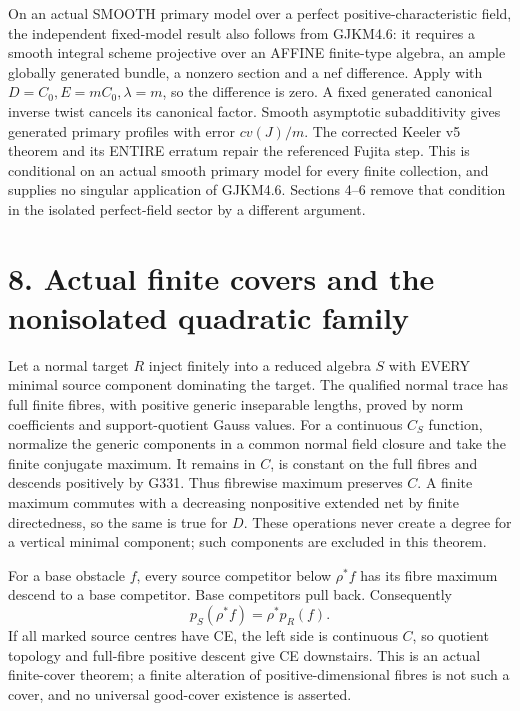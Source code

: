 \documentclass[11pt]{article}
\begin{document}
On an actual SMOOTH primary model over a perfect positive-characteristic field, the independent fixed-model result also follows from GJKM4.6: it requires a smooth integral scheme projective over an AFFINE finite-type algebra, an ample globally generated bundle, a nonzero section and a nef difference. Apply with \(D=C_0,E=mC_0,\lambda=m\), so the difference is zero. A fixed generated canonical inverse twist cancels its canonical factor. Smooth asymptotic subadditivity gives generated primary profiles with error \(c v(J)/m\). The corrected Keeler v5 theorem and its ENTIRE erratum repair the referenced Fujita step. This is conditional on an actual smooth primary model for every finite collection, and supplies no singular application of GJKM4.6. Sections 4--6 remove that condition in the isolated perfect-field sector by a different argument.

\section{8. Actual finite covers and the nonisolated quadratic family}

Let a normal target \(R\) inject finitely into a reduced algebra \(S\) with EVERY minimal source component dominating the target. The qualified normal trace has full finite fibres, with positive generic inseparable lengths, proved by norm coefficients and support-quotient Gauss values. For a continuous \(C_S\) function, normalize the generic components in a common normal field closure and take the finite conjugate maximum. It remains in \(C\), is constant on the full fibres and descends positively by G331. Thus fibrewise maximum preserves \(C\). A finite maximum commutes with a decreasing nonpositive extended net by finite directedness, so the same is true for \(D\). These operations never create a degree for a vertical minimal component; such components are excluded in this theorem.

For a base obstacle \(f\), every source competitor below \(\rho^*f\) has its fibre maximum descend to a base competitor. Base competitors pull back. Consequently
\[
p_S(\rho^*f)=\rho^*p_R(f).
\]
If all marked source centres have CE, the left side is continuous \(C\), so quotient topology and full-fibre positive descent give CE downstairs. This is an actual finite-cover theorem; a finite alteration of positive-dimensional fibres is not such a cover, and no universal good-cover existence is asserted.
\end{document}
